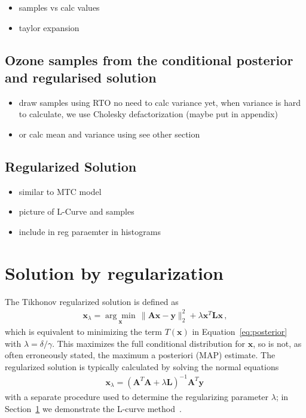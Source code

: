 \begin{itemize}
	\item samples vs calc values
	\item taylor expansion
\end{itemize}





\subsection{Ozone samples from the conditional posterior and regularised solution}
\begin{itemize}
	\item draw samples using RTO no need to calc variance yet, when variance is hard to calculate, we use Cholesky defactorization (maybe put in appendix)
	\item or calc mean and variance using see other section
\end{itemize}



\subsection{Regularized Solution}
\begin{itemize}
	\item similar to MTC model
	\item picture of L-Curve and samples 
	\item include in reg paraemter in histograms
\end{itemize}

\section{Solution by regularization} \label{sec:reg}
The Tikhonov regularized solution is defined as~\cite{hansen2010discrete} 
\begin{align}
	\bm{x}_{\lambda} =\underset{ \bm{x}}{\arg \min}\,  \lVert \bm{A}\bm{x} - \bm{y} \rVert_2^2 + \lambda \bm{x}^T \bm{L} \bm{x} \, ,
	\label{eq:XLam}
\end{align}
which is equivalent to minimizing the term $T(\bm{x})$ in Equation~\eqref{eq:posterior} with $\lambda = \delta / \gamma$. This maximizes the full conditional distribution for $\bm{x}$, so is not, as often erroneously stated, the maximum a posteriori (MAP) estimate. The regularized solution is typically calculated by solving the normal equations 
\begin{align}
	\bm{x}_{\lambda} = (\bm{A}^T\bm{A} + \lambda \bm{L} )^{-1} \bm{A}^T \bm{y} \label{eq:xLam} \, 
\end{align}
with a separate procedure used to determine the regularizing parameter $\lambda$; in Section~\ref{sec:reg} we demonstrate the L-curve method~\cite{hansen1993use}.

